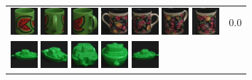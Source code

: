 {\begin{figure}[p]
\begin{tabular}{m{11cm} | m{3cm} |}
\includegraphics[width=1cm]{coil/beeld-32.eps}
\includegraphics[width=1cm]{coil/beeld-35.eps}
\includegraphics[width=1cm]{coil/beeld-34.eps}
\includegraphics[width=1cm]{coil/beeld-61.eps}
\includegraphics[width=1cm]{coil/beeld-60.eps}
\includegraphics[width=1cm]{coil/beeld-63.eps}
\includegraphics[width=1cm]{coil/beeld-62.eps}
& {\scriptsize 0.0}
\\
\includegraphics[width=1cm]{coil/beeld-54.eps}
\includegraphics[width=1cm]{coil/beeld-58.eps}
\includegraphics[width=1cm]{coil/beeld-59.eps}
\includegraphics[width=1cm]{coil/beeld-56.eps}
\includegraphics[width=1cm]{coil/beeld-55.eps}

\end{tabular}
\end{figure}}
